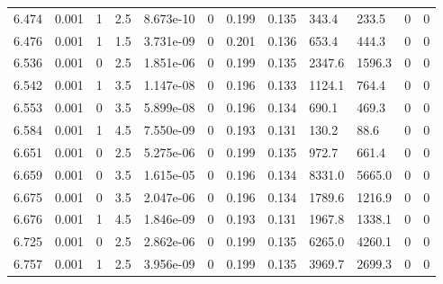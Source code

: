 \documentclass[preview]{standalone}
\begin{document}
{{{{{{\begin{tabular}{L{1.2cm}C{1.2cm} C{0.3cm}C{0.5cm} C{1.4cm}C{1.4cm} C{1.4cm}C{1.4cm} C{1.6cm}C{1.6cm} C{1.6cm}C{1.6cm}}
  6.474  &  0.001  & 1     & 2.5 &  8.673e-10  & 0  &  0.199&   0.135& 343.4 & 233.5   &  0 & 0  \\ 
  6.476  &  0.001  & 1     & 1.5 &  3.731e-09  & 0  &  0.201&   0.136& 653.4 & 444.3   &  0 & 0  \\ 
  6.536  &  0.001  & 0     & 2.5 &  1.851e-06  & 0  &  0.199&   0.135& 2347.6 & 1596.3   &  0 & 0  \\ 
  6.542  &  0.001  & 1     & 3.5 &  1.147e-08  & 0  &  0.196&   0.133& 1124.1 & 764.4   &  0 & 0  \\ 
  6.553  &  0.001  & 0     & 3.5 &  5.899e-08  & 0  &  0.196&   0.134& 690.1 & 469.3   &  0 & 0  \\ 
  6.584  &  0.001  & 1     & 4.5 &  7.550e-09  & 0  &  0.193&   0.131& 130.2 & 88.6   &  0 & 0  \\ 
  6.651  &  0.001  & 0     & 2.5 &  5.275e-06  & 0  &  0.199&   0.135& 972.7 & 661.4   &  0 & 0  \\ 
  6.659  &  0.001  & 0     & 3.5 &  1.615e-05  & 0  &  0.196&   0.134& 8331.0 & 5665.0   &  0 & 0  \\ 
  6.675  &  0.001  & 0     & 3.5 &  2.047e-06  & 0  &  0.196&   0.134& 1789.6 & 1216.9   &  0 & 0  \\ 
  6.676  &  0.001  & 1     & 4.5 &  1.846e-09  & 0  &  0.193&   0.131& 1967.8 & 1338.1   &  0 & 0  \\ 
  6.725  &  0.001  & 0     & 2.5 &  2.862e-06  & 0  &  0.199&   0.135& 6265.0 & 4260.1   &  0 & 0  \\ 
  6.757  &  0.001  & 1     & 2.5 &  3.956e-09  & 0  &  0.199&   0.135& 3969.7 & 2699.3   &  0 & 0  \\ 
\hline 
\end{tabular} 

}}}}}}
\end{document}
